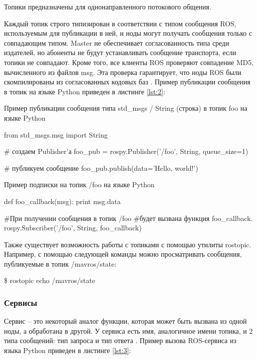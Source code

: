 Топики предназначены для однонаправленного потокового общения.

Каждый топик строго типизирован в соответствии с типом сообщения ROS, используемым для публикации в ней, и ноды могут получать сообщения только с совпадающим типом. Master не обеспечивает согласованность типа среди издателей, но абоненты не будут устанавливать сообщение транспорта, если топики не совпадают. Кроме того, все клиенты ROS проверяют совпадение MD5, вычисленного из файлов msg. Эта проверка гарантирует, что ноды ROS были скомпилированы из согласованных кодовых баз \cite{ros}. Пример публикации сообщения в топик на языке Python приведен в листинге \ref{lst:2}:

\begin{Program}[H]
	\caption{Пример публикации сообщения типа std\_msgs / String (строка) в топик foo на языке Python} \label{lst:2}
\begin{MyCode}
	from std_msgs.msg import String
	
	# создаем Publisher'а
	foo_pub = rospy.Publisher('/foo', String, queue_size=1)
	
	# публикуем сообщение
	foo_pub.publish(data='Hello, world!')
\end{MyCode}
\end{Program}

\begin{Program}[H]
	\caption{Пример подписки на топик /foo на языке Python} \label{lst:3}
\begin{MyCode}
	def foo_callback(msg):
	print msg.data
	
	#При получении сообщения в топик /foo
	#будет вызвана функция foo_callback.
	rospy.Subscriber('/foo', String, foo_callback)
\end{MyCode}
\end{Program}

Также существует возможность работы с топиками с помощью утилиты rostopic. Например, с помощью следующей команды можно просматривать сообщения, публикуемые в топик /mavros/state:

\$ rostopic echo /mavros/state
\subsubsection{Сервисы}

Сервис – это некоторый аналог функции, которая может быть вызвана из одной ноды, а обработана в другой. У сервиса есть имя, аналогичное имени топика, и 2 типа сообщений: тип запроса и тип ответа \cite{clover}. Пример вызова ROS-сервиса из языка Python приведен в листинге \ref{lst:3}:

